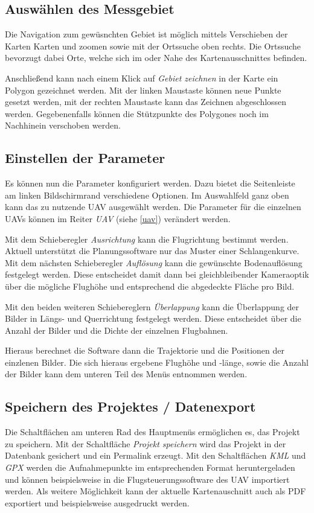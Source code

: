 \documentclass[a4paper,12pt,bibliography=totoc, listof=totoc,titlepage]{scrartcl}
\begin{document}
\subsection{Auswählen des Messgebiet}
Die Navigation zum gewüsnchten Gebiet ist möglich mittels Verschieben der Karten Karten und zoomen sowie mit der Ortssuche oben rechts. Die Ortssuche bevorzugt dabei Orte, welche sich im oder Nahe des Kartenausschnittes befinden.

Anschließend kann nach einem Klick auf \textit{Gebiet zeichnen} in der Karte ein Polygon gezeichnet werden. Mit der linken Maustaste können neue Punkte gesetzt werden, mit der rechten Maustaste kann das Zeichnen abgeschlossen werden. Gegebenenfalls können die Stützpunkte des Polygones noch im Nachhinein verschoben werden.

\subsection{Einstellen der Parameter}
Es können nun die Parameter konfiguriert werden. Dazu bietet die Seitenleiste am linken Bildschirmrand verschiedene Optionen. Im Auswahlfeld ganz oben kann das zu nutzende UAV ausgewählt werden. Die Parameter für die einzelnen UAVs können im Reiter \textit{UAV} (siehe \autoref{uav}) verändert werden.

Mit dem Schieberegler \textit{Ausrichtung} kann die Flugrichtung bestimmt werden. Aktuell unterstützt die Planungssoftware nur das Muster einer Schlangenkurve. Mit dem nächsten Schieberegler \textit{Auflösung} kann die gewünschte Bodenauflösung festgelegt werden. Diese entscheidet damit dann bei gleichbleibender Kameraoptik über die mögliche Flughöhe und entsprechend die abgedeckte Fläche pro Bild.

Mit den beiden weiteren Schiebereglern \textit{Überlappung} kann die Überlappung der Bilder in Längs- und Querrichtung festgelegt werden. Diese entscheidet über die Anzahl der Bilder und die Dichte der einzelnen Flugbahnen.

Hieraus berechnet die Software dann die Trajektorie und die Positionen der einzlenen Bilder. Die sich hieraus ergebene Flughöhe und -länge, sowie die Anzahl der Bilder kann dem unteren Teil des Menüs entnommen werden.

\subsection{Speichern des Projektes / Datenexport}
Die Schaltflächen am unteren Rad des Hauptmenüs ermöglichen es, das Projekt zu speichern. Mit der Schaltfläche \textit{Projekt speichern} wird das Projekt in der Datenbank gesichert und ein Permalink erzeugt. Mit den Schaltflächen \textit{KML} und \textit{GPX} werden die Aufnahmepunkte im entsprechenden Format heruntergeladen und können beispielsweise in die Flugsteuerungssoftware des UAV importiert werden. Als weitere Möglichkeit kann der aktuelle Kartenauschnitt auch als PDF exportiert und beispielsweise ausgedruckt werden.
\end{document}
